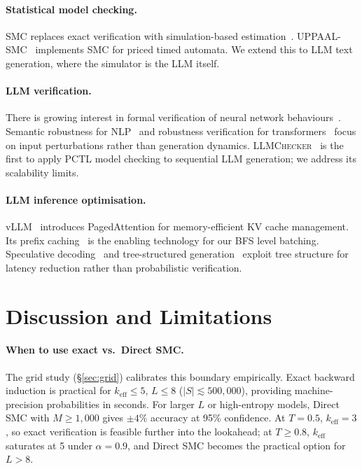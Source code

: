 \documentclass{article}
\begin{document}
\paragraph{Statistical model checking.}
SMC replaces exact verification with simulation-based
estimation~\citep{younes2002probabilistic,legay2010statistical}.
UPPAAL-SMC~\citep{bulychev2012uppaal} implements SMC for priced timed automata.
We extend this to LLM text generation, where the simulator is the LLM itself.

\paragraph{LLM verification.}
There is growing interest in formal verification of neural network
behaviours~\citep{huang2017safety}.
Semantic robustness for NLP~\citep{malfa2022king} and robustness
verification for transformers~\citep{shi2020robustness,liao2023robust} focus on
input perturbations rather than generation dynamics.
\textsc{LLMChecker}~\citep{gross2025llmchecker} is the first to apply PCTL
model checking to sequential LLM generation; we address its scalability limits.

\paragraph{LLM inference optimisation.}
vLLM~\citep{kwon2023efficient} introduces PagedAttention for memory-efficient
KV cache management.
Its prefix caching~\citep{zheng2023efficiently} is the enabling technology for
our BFS level batching.
Speculative decoding~\citep{leviathan2023fast} and tree-structured
generation~\citep{cai2024medusa} exploit tree structure for latency reduction
rather than probabilistic verification.

\section{Discussion and Limitations}
\label{sec:discussion}

\paragraph{When to use exact vs.\ Direct SMC.}
The grid study (\S\ref{sec:grid}) calibrates this boundary empirically.
Exact backward induction is practical for $k_\text{eff}{\le}5$, $L{\le}8$
($|S|{\lesssim}500{,}000$), providing machine-precision probabilities in seconds.
For larger $L$ or high-entropy models, Direct SMC with $M{\ge}1{,}000$ gives
$\pm4\%$ accuracy at 95\% confidence.
At $T{=}0.5$, $k_\text{eff}{=}3$, so exact verification is feasible further
into the lookahead; at $T{\ge}0.8$, $k_\text{eff}$ saturates at 5 under
$\alpha{=}0.9$, and Direct SMC becomes the practical option for $L{>}8$.
\end{document}
